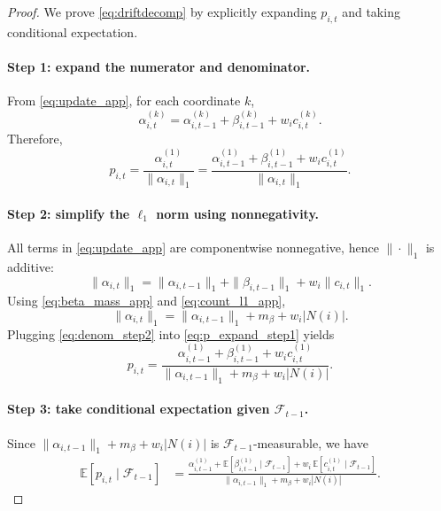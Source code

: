 \begin{proof}
We prove \eqref{eq:driftdecomp} by explicitly expanding \(p_{i,t}\) and taking conditional expectation.

\paragraph{Step 1: expand the numerator and denominator.}
From \eqref{eq:update_app}, for each coordinate \(k\),
\[
\alpha^{(k)}_{i,t}=\alpha^{(k)}_{i,t-1}+\beta^{(k)}_{i,t-1}+w_i c^{(k)}_{i,t}.
\]
Therefore,
\begin{equation}
p_{i,t}
=\frac{\alpha^{(1)}_{i,t}}{\|\alpha_{i,t}\|_1}
=\frac{\alpha^{(1)}_{i,t-1}+\beta^{(1)}_{i,t-1}+w_i c^{(1)}_{i,t}}
{\|\alpha_{i,t}\|_1}.
\label{eq:p_expand_step1}
\end{equation}

\paragraph{Step 2: simplify the $\ell_1$ norm using nonnegativity.}
All terms in \eqref{eq:update_app} are componentwise nonnegative, hence \(\|\cdot\|_1\) is additive:
\[
\|\alpha_{i,t}\|_1
=\|\alpha_{i,t-1}\|_1+\|\beta_{i,t-1}\|_1+w_i\|c_{i,t}\|_1.
\]
Using \eqref{eq:beta_mass_app} and \eqref{eq:count_l1_app},
\begin{equation}
\|\alpha_{i,t}\|_1 = \|\alpha_{i,t-1}\|_1 + m_\beta + w_i|N(i)|.
\label{eq:denom_step2}
\end{equation}
Plugging \eqref{eq:denom_step2} into \eqref{eq:p_expand_step1} yields
\begin{equation}
p_{i,t}
=\frac{\alpha^{(1)}_{i,t-1}+\beta^{(1)}_{i,t-1}+w_i c^{(1)}_{i,t}}
{\|\alpha_{i,t-1}\|_1+m_\beta+w_i|N(i)|}.
\label{eq:p_expand_step2}
\end{equation}

\paragraph{Step 3: take conditional expectation given $\mathcal{F}_{t-1}$.}
Since \(\|\alpha_{i,t-1}\|_1+m_\beta+w_i|N(i)|\) is \(\mathcal{F}_{t-1}\)-measurable, we have
\begin{align}
\mathbb{E}[p_{i,t}\mid\mathcal{F}_{t-1}]
&=
\frac{\alpha^{(1)}_{i,t-1}+\mathbb{E}[\beta^{(1)}_{i,t-1}\mid\mathcal{F}_{t-1}]
+w_i\,\mathbb{E}[c^{(1)}_{i,t}\mid\mathcal{F}_{t-1}]}
{\|\alpha_{i,t-1}\|_1+m_\beta+w_i|N(i)|}.
\label{eq:condexp_step3}
\end{align}


\end{proof}
